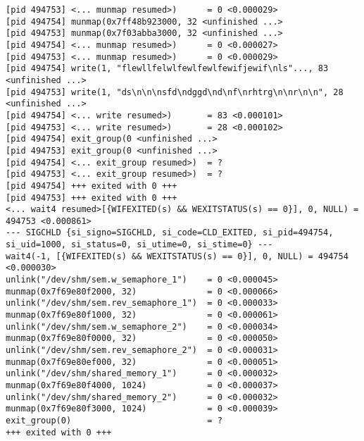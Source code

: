 \documentclass[a4paper, 12pt]{article}
\begin{document}
\begin{lstlisting}
[pid 494753] <... munmap resumed>)      = 0 <0.000029>
[pid 494754] munmap(0x7ff48b923000, 32 <unfinished ...>
[pid 494753] munmap(0x7f03abba3000, 32 <unfinished ...>
[pid 494754] <... munmap resumed>)      = 0 <0.000027>
[pid 494753] <... munmap resumed>)      = 0 <0.000029>
[pid 494754] write(1, "flewllfelwlfewlfewlfewifjewif\nls"..., 83 <unfinished ...>
[pid 494753] write(1, "ds\n\n\nsfd\ndggd\nd\nf\nrhtrg\n\nr\n\n", 28 <unfinished ...>
[pid 494754] <... write resumed>)       = 83 <0.000101>
[pid 494753] <... write resumed>)       = 28 <0.000102>
[pid 494754] exit_group(0 <unfinished ...>
[pid 494753] exit_group(0 <unfinished ...>
[pid 494754] <... exit_group resumed>)  = ?
[pid 494753] <... exit_group resumed>)  = ?
[pid 494754] +++ exited with 0 +++
[pid 494753] +++ exited with 0 +++
<... wait4 resumed>[{WIFEXITED(s) && WEXITSTATUS(s) == 0}], 0, NULL) = 494753 <0.000861>
--- SIGCHLD {si_signo=SIGCHLD, si_code=CLD_EXITED, si_pid=494754, si_uid=1000, si_status=0, si_utime=0, si_stime=0} ---
wait4(-1, [{WIFEXITED(s) && WEXITSTATUS(s) == 0}], 0, NULL) = 494754 <0.000030>
unlink("/dev/shm/sem.w_semaphore_1")    = 0 <0.000045>
munmap(0x7f69e80f2000, 32)              = 0 <0.000066>
unlink("/dev/shm/sem.rev_semaphore_1")  = 0 <0.000033>
munmap(0x7f69e80f1000, 32)              = 0 <0.000061>
unlink("/dev/shm/sem.w_semaphore_2")    = 0 <0.000034>
munmap(0x7f69e80f0000, 32)              = 0 <0.000050>
unlink("/dev/shm/sem.rev_semaphore_2")  = 0 <0.000031>
munmap(0x7f69e80ef000, 32)              = 0 <0.000051>
unlink("/dev/shm/shared_memory_1")      = 0 <0.000032>
munmap(0x7f69e80f4000, 1024)            = 0 <0.000037>
unlink("/dev/shm/shared_memory_2")      = 0 <0.000032>
munmap(0x7f69e80f3000, 1024)            = 0 <0.000039>
exit_group(0)                           = ?
+++ exited with 0 +++
\end{lstlisting}
\end{document}

